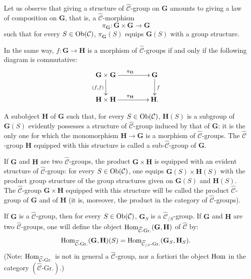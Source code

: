 \setcounter{footnote}{20}
\renewcommand{\thefootnote}{(\arabic{footnote})}
Let us observe that giving a structure of \(\widehat{\mathcal{C}}\)-group on
\(\mathbf{G}\) amounts to giving a law of composition on \(\mathbf{G}\), that
is, a \(\widehat{\mathcal{C}}\)-morphism
\[
\pi_{\mathbf{G}}\colon\mathbf{G}\times\mathbf{G}\to\mathbf{G}
\]
such that for every \(S\in\operatorname{Ob}(\mathcal{C})\), \(\pi_{\mathbf{G}}(S)\) equips
\(\mathbf{G}(S)\) with a group structure.

In the same way, \(f\colon\mathbf{G}\to\mathbf{H}\) is a morphism of
\(\widehat{\mathcal{C}}\)-groups if and only if the following diagram is
commutative:
\[
\xymatrix@C=16mm@R=8mm{
\mathbf{G}\times\mathbf{G} \ar[r]^{\pi_{\mathbf{G}}} \ar[d]_{(f,f)}
  & \mathbf{G} \ar[d]^{f} \\
\mathbf{H}\times\mathbf{H} \ar[r]^{\pi_{\mathbf{H}}}
  & \mathbf{H}.
}
\]

A subobject \(\mathbf{H}\) of \(\mathbf{G}\) such that, for every
\(S\in\operatorname{Ob}(\mathcal{C})\), \(\mathbf{H}(S)\) is a subgroup of \(\mathbf{G}(S)\)
evidently possesses a structure of \(\widehat{\mathcal{C}}\)-group induced by
that of \(\mathbf{G}\): it is the only one for which the monomorphism
\(\mathbf{H}\to\mathbf{G}\) is a morphism of \(\widehat{\mathcal{C}}\)-groups.
The \(\widehat{\mathcal{C}}\)-group \(\mathbf{H}\) equipped with this structure
is called a sub-\(\widehat{\mathcal{C}}\)-group of \(\mathbf{G}\).

If \(\mathbf{G}\) and \(\mathbf{H}\) are two \(\widehat{\mathcal{C}}\)-groups,
the product \(\mathbf{G}\times\mathbf{H}\) is equipped with an evident
structure of \(\widehat{\mathcal{C}}\)-group: for every \(S\in\operatorname{Ob}(\mathcal{C})\),
one equips \(\mathbf{G}(S)\times\mathbf{H}(S)\) with the product group
structure of the group structures given on \(\mathbf{G}(S)\) and
\(\mathbf{H}(S)\). The \(\widehat{\mathcal{C}}\)-group
\(\mathbf{G}\times\mathbf{H}\) equipped with this structure will be called the
product \(\widehat{\mathcal{C}}\)-group of \(\mathbf{G}\) and of \(\mathbf{H}\)
(it is, moreover, the product in the category of
\(\widehat{\mathcal{C}}\)-groups).

If \(\mathbf{G}\) is a \(\widehat{\mathcal{C}}\)-group, then for every
\(S\in\operatorname{Ob}(\mathcal{C})\), \(\mathbf{G}_{S}\) is a
\(\widehat{\mathcal{C}}_{/S}\)-group. If \(\mathbf{G}\) and \(\mathbf{H}\) are
two \(\widehat{\mathcal{C}}\)-groups, one will define the object
\(\operatorname{Hom}_{\widehat{\mathcal{C}}\text{-Gr.}}(\mathbf{G},\mathbf{H})\) of
\(\widehat{\mathcal{C}}\) by:
\[
\operatorname{Hom}_{\widehat{\mathcal{C}}\text{-Gr.}}(\mathbf{G},\mathbf{H})(S)
=\operatorname{Hom}_{\widehat{\mathcal{C}}_{/S}\text{-Gr.}}(\mathbf{G}_{S},\mathbf{H}_{S}).
\]
(Note: \(\operatorname{Hom}_{\widehat{\mathcal{C}}\text{-Gr.}}\) is not in general a
\(\widehat{\mathcal{C}}\)-group, nor a fortiori the object \(\operatorname{Hom}\) in
the category \((\widehat{\mathcal{C}}\text{-Gr.})\).)

